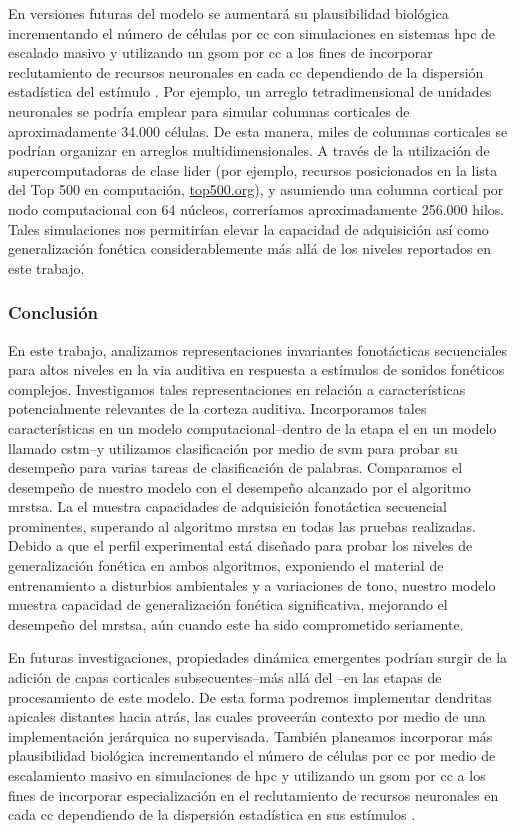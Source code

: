 En versiones futuras del modelo se aumentará su plausibilidad biológica incrementando el número de células por \gls{cc} con simulaciones en sistemas \gls{hpc} de escalado masivo y utilizando un \gls{gsom} por \gls{cc} a los fines de incorporar reclutamiento de recursos neuronales en cada \gls{cc} dependiendo de la dispersión estadística del estímulo \cite{Meyer19113}. Por ejemplo, un arreglo tetradimensional de unidades neuronales se podría emplear para simular columnas corticales de aproximadamente 34.000 células. De esta manera, miles de columnas corticales se podrían organizar en arreglos multidimensionales. A través de la utilización de supercomputadoras de clase lider (por ejemplo, recursos posicionados en la lista del Top 500 en computación, \url{top500.org}), y asumiendo una columna cortical por nodo computacional con 64 núcleos, correríamos aproximadamente 256.000 hilos. Tales simulaciones nos permitirían elevar la capacidad de adquisición así como generalización fonética considerablemente más allá de los niveles reportados en este trabajo.


\subsubsection{Conclusión}

En este trabajo, analizamos representaciones invariantes fonotácticas secuenciales para altos niveles en la via auditiva en respuesta a estímulos de sonidos fonéticos complejos. Investigamos tales representaciones en relación a características potencialmente relevantes de la corteza auditiva. Incorporamos tales características en un modelo computacional--dentro de la etapa \gls{el} en un modelo llamado \gls{cstm}--y utilizamos clasificación por medio de \gls{svm} para probar su desempeño para varias tareas de clasificación de palabras. Comparamos el desempeño de nuestro modelo con el desempeño alcanzado por el algoritmo \gls{mrstsa}. La \gls{el} muestra capacidades de adquisición fonotáctica secuencial prominentes, superando al algoritmo \gls{mrstsa} en todas las pruebas realizadas. Debido a que el perfil experimental está diseñado para probar los niveles de generalización fonética en ambos algoritmos, exponiendo el material de entrenamiento a disturbios ambientales y a variaciones de tono, nuestro modelo muestra capacidad de generalización fonética significativa, mejorando el desempeño del \gls{mrstsa}, aún cuando este ha sido comprometido seriamente. 

En futuras investigaciones, propiedades dinámica emergentes podrían surgir de la adición de capas corticales subsecuentes--más allá del --en las etapas de procesamiento de este modelo. De esta forma podremos implementar dendritas apicales distantes hacia atrás, las cuales proveerán contexto por medio de una implementación jerárquica no supervisada. También planeamos incorporar más plausibilidad biológica incrementando el número de células por \gls{cc} por medio de escalamiento masivo en simulaciones de \gls{hpc} y utilizando un \gls{gsom} por \gls{cc} a los fines de incorporar especialización en el reclutamiento de recursos neuronales en cada \gls{cc} dependiendo de la dispersión estadística en sus estímulos \cite{Meyer19113}.

